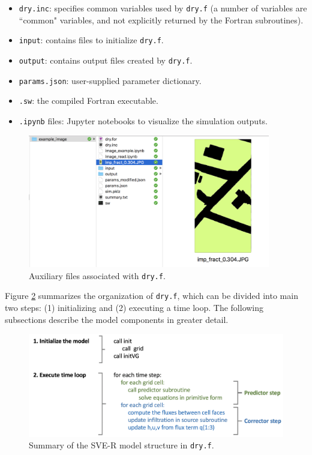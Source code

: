 \documentclass{article}
\newcommand{\code}[1]{\texttt{#1}}
\begin{document}
\begin{itemize}
	\item \code{\code{dry.inc}}: specifies common variables used by \code{dry.f}  (a number of variables are ``common" variables, and not explicitly returned by the Fortran subroutines). 
	\item \code{input}:  contains files to initialize \code{dry.f}.
	\item \code{output}: contains output files created by \code{dry.f}.
	\item \code{params.json}: user-supplied parameter dictionary.
	\item \code{.sw}: the compiled Fortran executable.
	\item \code{.ipynb} files: Jupyter notebooks to visualize the simulation outputs.
\end{itemize}
 


 \begin{figure}[h]
 \centering
\includegraphics[width=25pc]{grid/files.png}
 \caption{Auxiliary files associated with \code{dry.f}.}
 \label{files}
 \end{figure}


Figure \ref{summary} summarizes the organization of \code{dry.f}, which can be divided into main two steps: (1) initializing and (2) executing a time loop.   The following subsections describe the model components in greater detail.


\begin{figure}[h]
 \centering
\includegraphics[width=30pc]{grid/summary.png}
 \caption{Summary of the SVE-R model structure in \code{dry.f}.}
 \label{summary}
 \end{figure}
\end{document}
